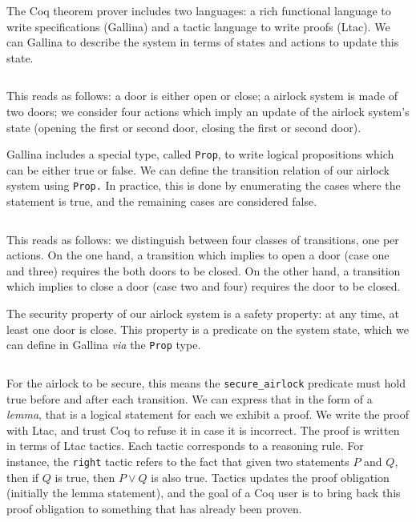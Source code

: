 \begin{example}
  The Coq theorem prover includes two languages: a rich functional language to
  write specifications ({\sc Gallina}) and a tactic language to write proofs
  ({\sc Ltac}).
  We can {\sc Gallina} to describe the system in terms of states and actions to
  update this state.

  \inputminted[frame=single]{coq}{Listings/Airlock1.v}

  This reads as follows: a door is either open or close; a airlock system is
  made of two doors; we consider four actions which imply an update of the
  airlock system's state (opening the first or second door, closing the first or
  second door).

  {\sc Gallina} includes a special type, called \texttt{Prop}, to write logical
  propositions which can be either true or false.
  We can define the transition relation of our airlock system using
  \texttt{Prop.}
  In practice, this is done by enumerating the cases where the statement is
  true, and the remaining cases are considered false.

  \inputminted[frame=single]{coq}{Listings/Airlock2.v}

  This reads as follows: we distinguish between four classes of transitions, one
  per actions.
  On the one hand, a transition which implies to open a door (case one and
  three) requires the both doors to be closed.
  On the other hand, a transition which implies to close a door (case two and
  four) requires the door to be closed.

  The security property of our airlock system is a safety property: at any time,
  at least one door is close.
  This property is a predicate on the system state, which we can define in {\sc
    Gallina} \emph{via} the \texttt{Prop} type.

  \inputminted[frame=single]{coq}{Listings/Airlock3.v}

  For the airlock to be secure, this means the \texttt{secure\_airlock}
  predicate must hold true before and after each transition.
  We can express that in the form of a \emph{lemma}, that is a logical statement
  for each we exhibit a proof.
  We write the proof with {\sc Ltac}, and trust Coq to refuse it in case it is
  incorrect.
  The proof is written in terms of {\sc Ltac} tactics.
  Each tactic corresponds to a reasoning rule.
  For instance, the \texttt{right} tactic refers to the fact that given two
  statements $P$ and $Q$, then if $Q$ is true, then $P \vee Q$ is also
  true. Tactics updates the proof obligation (initially the lemma statement),
  and the goal of a Coq user is to bring back this proof obligation to something
  that has already been proven.


\end{example}
